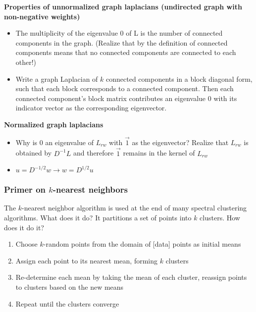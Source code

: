 \documentclass{article}
\begin{document}
{        \textbf{Properties of unnormalized graph laplacians (undirected graph
with non-negative weights)}
        \begin{itemize}
           \item The multiplicity of the eigenvalue 0 of L is the number of
connected components in the graph. (Realize that by the definition of connected
components means that
no connected components are connected to each other!)
            \item Write a graph Laplacian of \ensuremath{k} connected components
in a block diagonal form, such that each block corresponds to a connected
component. Then each connected component's block matrix contributes an
eigenvalue \ensuremath{0} with its indicator vector as the corresponding
eigenvector.
        \end{itemize}
        \textbf{Normalized graph laplacians}
        \begin{itemize}
        \item Why is \ensuremath{0} an eigenvalue of \ensuremath{L_{rw}}
with \ensuremath{\vec{1}} as the eigenvector? Realize that \ensuremath{L_{rw}}
is obtained by \ensuremath{D^{-1}L} and therefore \ensuremath{\vec{1}} remains
in the kernel of \ensuremath{L_{rw}}
        \item \ensuremath{u=D^{-1/2}w \rightarrow w = D^{1/2}u}
        \end{itemize} 

        \subsubsection{Primer on \ensuremath{k}-nearest neighbors}
        The \ensuremath{k}-nearest neighbor algorithm is used at the end of many
spectral clustering algorithms. What does it do? It partitions a set of points
into \ensuremath{k} clusters.
        How does it do it?
        \begin{enumerate}
        \item Choose \ensuremath{k}-random points from the domain of [data] points
as initial means 
        \item Assign each point to its nearest mean, forming \ensuremath{k}
clusters
        \item Re-determine each mean by taking the mean of each cluster,
reassign points to clusters based on the new means
        \item Repeat until the clusters converge
        \end{enumerate}
    
}
\end{document}

